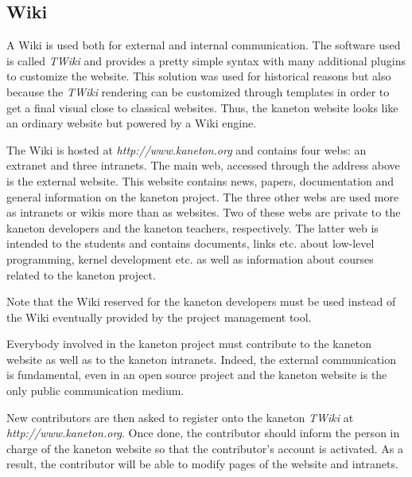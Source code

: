 %
%
%
%
%
%

%
%

\subsection{Wiki}
\label{section:wiki}

A Wiki is used both for external and internal communication. The software
used is called \textit{TWiki} and provides a pretty simple syntax with
many additional plugins to customize the website. This solution was used
for historical reasons but also because the \textit{TWiki} rendering can
be customized through templates in order to get a final visual close to
classical websites. Thus, the kaneton website looks like an ordinary
website but powered by a Wiki engine.

The Wiki is hosted at \textit{http://www.kaneton.org} and contains four
webs: an extranet and three intranets. The main web, accessed through the
address above is the external website. This website contains news, papers,
documentation and general information on the kaneton project. The three other
webs are used more as intranets or wikis more than as websites. Two of these
webs are private to the kaneton developers and the kaneton teachers,
respectively. The latter web is intended to the students and contains
documents, links etc. about low-level programming, kernel development etc.
as well as information about courses related to the kaneton project.

Note that the Wiki reserved for the kaneton developers must be used
instead of the Wiki eventually provided by the project management tool.

Everybody involved in the kaneton project must contribute to the kaneton
website as well as to the kaneton intranets. Indeed, the external communication
is fundamental, even in an open source project and the kaneton website is
the only public communication medium.

New contributors are then asked to register onto the kaneton \textit{TWiki}
at \textit{http://www.kaneton.org}. Once done, the contributor should
inform the person in charge of the kaneton website so that  the contributor's
account is activated. As a result, the contributor will be able to modify
pages of the website and intranets.
